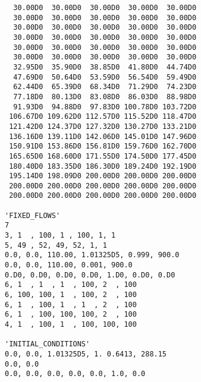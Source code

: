 \begin{verbatim}
  30.00D0  30.00D0  30.00D0  30.00D0  30.00D0
  30.00D0  30.00D0  30.00D0  30.00D0  30.00D0
  30.00D0  30.00D0  30.00D0  30.00D0  30.00D0
  30.00D0  30.00D0  30.00D0  30.00D0  30.00D0
  30.00D0  30.00D0  30.00D0  30.00D0  30.00D0
  30.00D0  30.00D0  30.00D0  30.00D0  30.00D0
  32.95D0  35.90D0  38.85D0  41.80D0  44.74D0
  47.69D0  50.64D0  53.59D0  56.54D0  59.49D0
  62.44D0  65.39D0  68.34D0  71.29D0  74.23D0
  77.18D0  80.13D0  83.08D0  86.03D0  88.98D0
  91.93D0  94.88D0  97.83D0 100.78D0 103.72D0 
 106.67D0 109.62D0 112.57D0 115.52D0 118.47D0
 121.42D0 124.37D0 127.32D0 130.27D0 133.21D0 
 136.16D0 139.11D0 142.06D0 145.01D0 147.96D0
 150.91D0 153.86D0 156.81D0 159.76D0 162.70D0 
 165.65D0 168.60D0 171.55D0 174.50D0 177.45D0
 180.40D0 183.35D0 186.30D0 189.24D0 192.19D0 
 195.14D0 198.09D0 200.00D0 200.00D0 200.00D0
 200.00D0 200.00D0 200.00D0 200.00D0 200.00D0 
 200.00D0 200.00D0 200.00D0 200.00D0 200.00D0

'FIXED_FLOWS'
7
3, 1  , 100, 1 , 100, 1, 1
5, 49 , 52, 49, 52, 1, 1
0.0, 0.0, 110.00, 1.01325D5, 0.999, 900.0
0.0, 0.0, 110.00, 0.001, 900.0
0.D0, 0.D0, 0.D0, 0.D0, 1.D0, 0.D0, 0.D0
6, 1  , 1  , 1  , 100, 2  , 100
6, 100, 100, 1  , 100, 2  , 100
6, 1  , 100, 1  , 1  , 2  , 100
6, 1  , 100, 100, 100, 2  , 100
4, 1  , 100, 1  , 100, 100, 100

'INITIAL_CONDITIONS'
0.0, 0.0, 1.01325D5, 1. 0.6413, 288.15 
0.0, 0.0
0.0, 0.0, 0.0, 0.0, 0.0, 1.0, 0.0

\end{verbatim}
